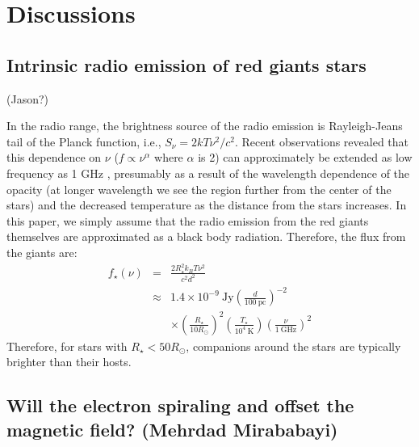 \documentclass{emulateapj}
\begin{document}
\newpage

\section{Discussions}
\label{s:discussion}

\subsection{Intrinsic radio emission of red giants stars}
\label{ss:RGradio}

(Jason?)

In the radio range, the brightness source of the radio emission is Rayleigh-Jeans tail of the Planck function, i.e., $S_{\nu } = 2kT\nu^2/c^2$. Recent observations revealed that this dependence on $\nu$ ($f \propto \nu^{\alpha }$ where $\alpha $ is 2) can approximately be extended as low frequency as 1 GHz \citet{gorman2013}, presumably as a result of the wavelength dependence of the opacity (at longer wavelength we see the region further from the center of the stars) and the decreased temperature as the distance from the stars increases. 
In this paper, we simply assume that the radio emission from the red giants themselves are approximated as a black body radiation. Therefore, the flux from the giants are:
\begin{eqnarray}
f_{\star } (\nu ) &=& \frac{2R_{\star }^2 k_B T \nu^2}{c^2 d^2}  \\
&\approx & 1.4 \times 10^{-9} ~\mbox{Jy} \left( \frac{d}{100 ~\mbox{pc}} \right)^{-2} \\
&& \times \left( \frac{R_{\star }}{10 R_{\odot }} \right)^2 \left( \frac{T_{\star }}{10^{4}~\mbox{K}} \right) \left( \frac{\nu}{1 ~\mbox{GHz}} \right)^2 
\end{eqnarray}
Therefore, for stars with $R_{\star } < 50 R_{\odot}$, companions around the stars are typically brighter than their hosts. 




\subsection{Will the electron spiraling and offset the magnetic field? (Mehrdad Mirababayi)}
\label{ss:offset}
\end{document}
